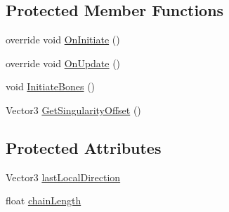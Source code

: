 \subsection*{Protected Member Functions}
\begin{DoxyCompactItemize}
\item 
override void \mbox{\hyperlink{class_root_motion_1_1_final_i_k_1_1_i_k_solver_heuristic_a665700645200f3960f186bb6d3835691}{On\+Initiate}} ()
\item 
override void \mbox{\hyperlink{class_root_motion_1_1_final_i_k_1_1_i_k_solver_heuristic_a88c1314811a687a2843f8679c07e82c0}{On\+Update}} ()
\item 
void \mbox{\hyperlink{class_root_motion_1_1_final_i_k_1_1_i_k_solver_heuristic_ad2b167b9cce7ca0288226353e44d09d3}{Initiate\+Bones}} ()
\item 
Vector3 \mbox{\hyperlink{class_root_motion_1_1_final_i_k_1_1_i_k_solver_heuristic_a6bd963fe427300f69903f0d83f6028b7}{Get\+Singularity\+Offset}} ()
\end{DoxyCompactItemize}
\subsection*{Protected Attributes}
\begin{DoxyCompactItemize}
\item 
Vector3 \mbox{\hyperlink{class_root_motion_1_1_final_i_k_1_1_i_k_solver_heuristic_ad2cf3502a75ac245a50f98c0b32a375e}{last\+Local\+Direction}}
\item 
float \mbox{\hyperlink{class_root_motion_1_1_final_i_k_1_1_i_k_solver_heuristic_a87198cadb3c3c02a29963fb0adea739b}{chain\+Length}}
\end{DoxyCompactItemize}

